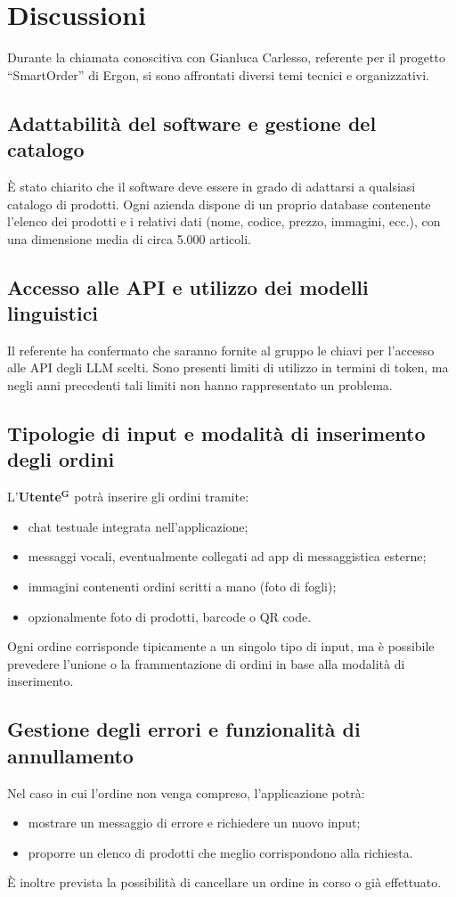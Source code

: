 \documentclass[a4paper,12pt]{article}
\newcommand{\term}[1]{\textbf{#1}$^\mathbf{G}$}
\begin{document}
\section{Discussioni}
Durante la chiamata conoscitiva con Gianluca Carlesso, referente per il progetto “SmartOrder” di Ergon, si sono affrontati diversi temi tecnici e organizzativi.

\subsection{Adattabilità del software e gestione del catalogo}
È stato chiarito che il software deve essere in grado di adattarsi a qualsiasi catalogo di prodotti.  
Ogni azienda dispone di un proprio database contenente l’elenco dei prodotti e i relativi dati (nome, codice, prezzo, immagini, ecc.), con una dimensione media di circa 5.000 articoli.

\subsection{Accesso alle API e utilizzo dei modelli linguistici}
Il referente ha confermato che saranno fornite al gruppo le chiavi per l’accesso alle API degli LLM scelti.  
Sono presenti limiti di utilizzo in termini di token, ma negli anni precedenti tali limiti non hanno rappresentato un problema.

\subsection{Tipologie di input e modalità di inserimento degli ordini}
L’\term{Utente} potrà inserire gli ordini tramite:
\begin{itemize}
    \item chat testuale integrata nell’applicazione;
    \item messaggi vocali, eventualmente collegati ad app di messaggistica esterne;
    \item immagini contenenti ordini scritti a mano (foto di fogli);
    \item opzionalmente foto di prodotti, barcode o QR code.
\end{itemize}
Ogni ordine corrisponde tipicamente a un singolo tipo di input, ma è possibile prevedere l’unione o la frammentazione di ordini in base alla modalità di inserimento.

\subsection{Gestione degli errori e funzionalità di annullamento}
Nel caso in cui l’ordine non venga compreso, l’applicazione potrà:
\begin{itemize}
    \item mostrare un messaggio di errore e richiedere un nuovo input;
    \item proporre un elenco di prodotti che meglio corrispondono alla richiesta.
\end{itemize}
È inoltre prevista la possibilità di cancellare un ordine in corso o già effettuato.
\end{document}

